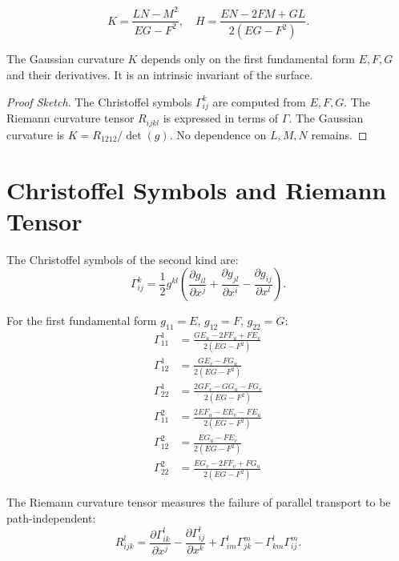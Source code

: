 \begin{definition}
\[
K = \frac{LN - M^2}{EG - F^2}, \quad
H = \frac{EN - 2FM + GL}{2(EG - F^2)}.
\]
\end{definition}

\begin{theorem}
The Gaussian curvature $K$ depends only on the first fundamental form $E, F, G$ and their derivatives. It is an intrinsic invariant of the surface.
\end{theorem}

\begin{proof}[Proof Sketch]
The Christoffel symbols  $\Gamma_{ij}^k$ are computed from $E, F, G$. The Riemann curvature tensor  $R_{ijkl}$ is expressed in terms of $\Gamma$. The Gaussian curvature is $K = R_{1212} / \det(g)$. No dependence on $L, M, N$ remains.
\end{proof}

\section{Christoffel Symbols and Riemann Tensor}

\begin{definition}
The Christoffel symbols of the second kind are:
\[
\Gamma_{ij}^k = \frac{1}{2} g^{kl} \left(\frac{\partial g_{il}}{\partial x^j} + \frac{\partial g_{jl}}{\partial x^i} - \frac{\partial g_{ij}}{\partial x^l}\right).
\]
\end{definition}

For the first fundamental form $g_{11} = E$, $g_{12} = F$, $g_{22} = G$:
\begin{align*}
\Gamma_{11}^1 &= \frac{GE_u - 2FF_u + FE_v}{2(EG-F^2)} \\
\Gamma_{12}^1 &= \frac{GE_v - FG_u}{2(EG-F^2)} \\
\Gamma_{22}^1 &= \frac{2GF_v - GG_u - FG_v}{2(EG-F^2)} \\
\Gamma_{11}^2 &= \frac{2EF_u - EE_v - FE_u}{2(EG-F^2)} \\
\Gamma_{12}^2 &= \frac{EG_u - FE_v}{2(EG-F^2)} \\
\Gamma_{22}^2 &= \frac{EG_v - 2FF_v + FG_u}{2(EG-F^2)}
\end{align*}

\begin{definition}
The Riemann curvature tensor measures the failure of parallel transport to be path-independent:
\[
R^l_{ijk} = \frac{\partial \Gamma_{ik}^l}{\partial x^j} - \frac{\partial \Gamma_{ij}^l}{\partial x^k} + \Gamma_{im}^l \Gamma_{jk}^m - \Gamma_{km}^l \Gamma_{ij}^m.
\]
\end{definition}

